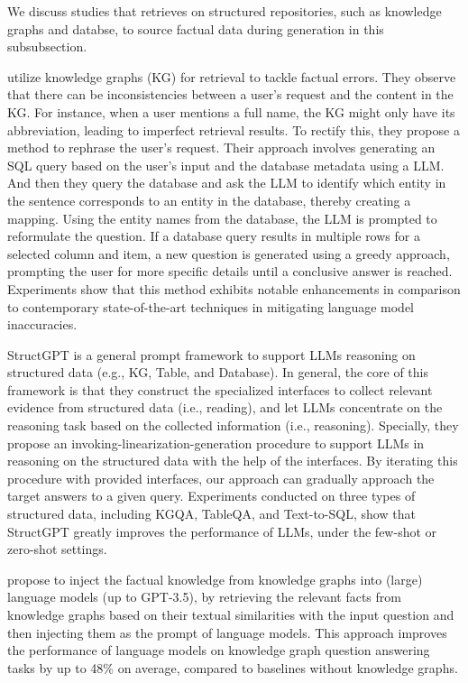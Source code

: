 We discuss studies that retrieves on structured repositories, such as knowledge graphs and databse, to source factual data during generation in this subsubsection.

\citet{zhang2023mitigating} utilize knowledge graphs (KG) for retrieval to tackle factual errors. They observe that there can be inconsistencies between a user's request and the content in the KG. For instance, when a user mentions a full name, the KG might only have its abbreviation, leading to imperfect retrieval results. To rectify this, they propose a method to rephrase the user's request. Their approach involves generating an SQL query based on the user's input and the database metadata using a LLM. And then they query the database and ask the LLM to identify which entity in the sentence corresponds to an entity in the database, thereby creating a mapping. Using the entity names from the database, the LLM is prompted to reformulate the question. If a database query results in multiple rows for a selected column and item, a new question is generated using a greedy approach, prompting the user for more specific details until a conclusive answer is reached. Experiments show that this method exhibits notable enhancements in comparison to contemporary state-of-the-art techniques in mitigating language model inaccuracies.

StructGPT \citep{StructGPT} is a general prompt framework to support LLMs reasoning on structured data (e.g., KG, Table, and Database).
In general, the core of this framework is that they construct the specialized interfaces to collect relevant evidence from structured data (i.e., reading), and let LLMs concentrate on the reasoning task based on the collected information (i.e., reasoning). 
Specially, they propose an invoking-linearization-generation procedure to support LLMs in reasoning on the structured data with the help of the interfaces.
By iterating this procedure with provided interfaces, our approach can gradually approach the target answers to a given query.
Experiments conducted on three types of structured data, including KGQA, TableQA, and Text-to-SQL, show that StructGPT greatly improves the performance of LLMs, under the few-shot or zero-shot settings.


\citet{baek2023knowledgeaugmented} propose to inject the factual knowledge from knowledge graphs into (large) language models (up to GPT-3.5), by retrieving the relevant facts from knowledge graphs based on their textual similarities with the input question and then injecting them as the prompt of language models. This approach improves the performance of language models on knowledge graph question answering tasks \citep{Mintaka} by up to 48\% on average, compared to baselines without knowledge graphs.

